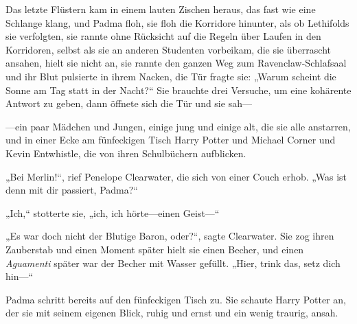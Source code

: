 Das letzte Flüstern kam in einem lauten Zischen heraus, das fast wie eine Schlange klang, und Padma floh, sie floh die Korridore hinunter, als ob Lethifolds sie verfolgten, sie rannte ohne Rücksicht auf die Regeln über Laufen in den Korridoren, selbst als sie an anderen Studenten vorbeikam, die sie überrascht ansahen, hielt sie nicht an, sie rannte den ganzen Weg zum Ravenclaw-Schlafsaal und ihr Blut pulsierte in ihrem Nacken, die Tür fragte sie: „Warum scheint die Sonne am Tag statt in der Nacht?“ Sie brauchte drei Versuche, um eine kohärente Antwort zu geben, dann öffnete sich die Tür und sie sah—

—ein paar Mädchen und Jungen, einige jung und einige alt, die sie alle anstarren, und in einer Ecke am fünfeckigen Tisch Harry Potter und Michael Corner und Kevin Entwhistle, die von ihren Schulbüchern aufblicken.

„Bei Merlin!“, rief Penelope Clearwater, die sich von einer Couch erhob. „Was ist denn mit dir passiert, Padma?“

„Ich,“ stotterte sie, „ich, ich hörte—einen Geist—“

„Es war doch nicht der Blutige Baron, oder?“, sagte Clearwater. Sie zog ihren Zauberstab und einen Moment später hielt sie einen Becher, und einen \emph{Aguamenti} später war der Becher mit Wasser gefüllt. „Hier, trink das, setz dich hin—“

Padma schritt bereits auf den fünfeckigen Tisch zu. Sie schaute Harry Potter an, der sie mit seinem eigenen Blick, ruhig und ernst und ein wenig traurig, ansah.

